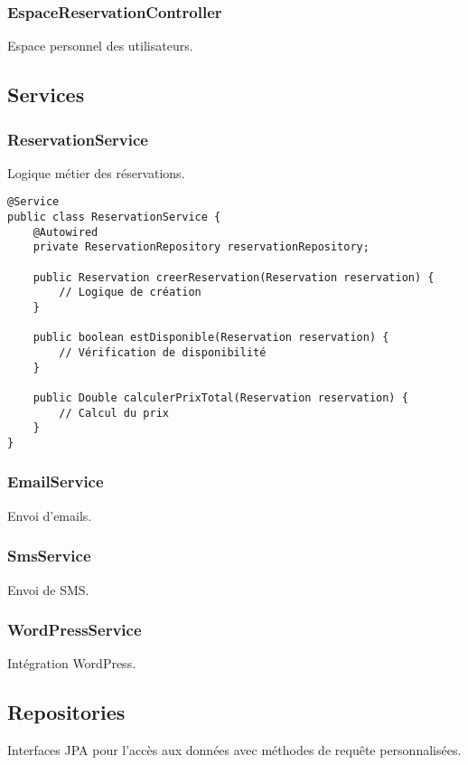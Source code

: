 \documentclass[12pt,a4paper]{article}
\begin{document}
\subsubsection{EspaceReservationController}
Espace personnel des utilisateurs.

\subsection{Services}

\subsubsection{ReservationService}
Logique métier des réservations.

\begin{lstlisting}[caption=Service ReservationService - Méthodes principales]
@Service
public class ReservationService {
    @Autowired
    private ReservationRepository reservationRepository;
    
    public Reservation creerReservation(Reservation reservation) {
        // Logique de création
    }
    
    public boolean estDisponible(Reservation reservation) {
        // Vérification de disponibilité
    }
    
    public Double calculerPrixTotal(Reservation reservation) {
        // Calcul du prix
    }
}
\end{lstlisting}

\subsubsection{EmailService}
Envoi d'emails.

\subsubsection{SmsService}
Envoi de SMS.

\subsubsection{WordPressService}
Intégration WordPress.

\subsection{Repositories}

Interfaces JPA pour l'accès aux données avec méthodes de requête personnalisées.
\end{document}
